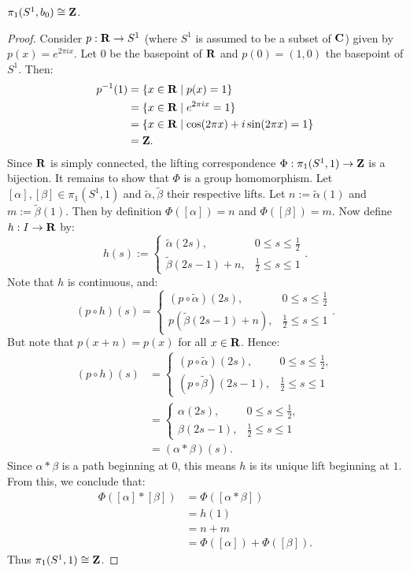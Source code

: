 \begin{theorem}
	$\pi_1(S^1,b_0) \cong \mathbf{Z}$.
\end{theorem}
	\begin{proof}
		Consider $p:\mathbf{R} \rightarrow S^1$ (where $S^1$ is assumed to be a subset of $\mathbf{C}$) given by $p(x) = e^{2 \pi i x}$. Let $0$ be the basepoint of $\mathbf{R}$ and $p(0) = (1,0)$ the basepoint of $S^1$. Then:
		\begin{align*}
			p^{-1}(1)
			&=  \{x \in \mathbf{R} \mid p(x) = 1\} \\
			&= \{x \in \mathbf{R} \mid e^{2 \pi i x} = 1\} \\
			&=  \{x \in \mathbf{R} \mid \cos(2 \pi x) + i \sin (2 \pi x) = 1\}\\
			& = \mathbf{Z}.
		\end{align*}	
	Since $\mathbf{R}$ is simply connected, the lifting correspondence $\Phi:\pi_1(S^1, 1) \rightarrow \mathbf{Z}$ is a bijection. It remains to show that $\Phi$ is a group homomorphism. Let $[\alpha],[\beta] \in \pi_1(S^1,1)$ and $\tilde{\alpha},\tilde{\beta}$ their respective lifts. Let $n:= \tilde{\alpha}(1)$ and $m := \tilde{\beta}(1)$. Then by definition $\Phi([\alpha]) = n$ and $\Phi([\beta]) = m$. Now define $h:I \rightarrow \mathbf{R}$ by:
	\[
		h(s) := 
		\begin{cases}
			\tilde{\alpha}(2s), & 0 \leq s \leq \frac{1}{2} \\
			\tilde{\beta}(2s-1) + n, & \frac{1}{2} \leq s \leq 1
		\end{cases}.
	\]
	Note that $h$ is continuous, and:
	\[
		(p \circ h)(s) =
		\begin{cases}
			(p \circ \tilde{\alpha})(2s), & 0\leq s \leq \frac{1}{2} \\
			p( \tilde{\beta}(2s-1) + n), & \frac{1}{2} \leq s \leq 1
		\end{cases}.
	\] 
	But note that $p(x+n) = p(x)$ for all $x \in \mathbf{R}$. Hence:
		\begin{align*}
			(p \circ h)(s) 
			&=\begin{cases}
				(p \circ \tilde{\alpha})(2s), & 0\leq s \leq \frac{1}{2},\\
				(p \circ \tilde{\beta})(2s-1), & \frac{1}{2} \leq s \leq 1
				\end{cases} \\
			&=\begin{cases}
				\alpha(2s), & 0\leq s \leq \frac{1}{2},\\
				\beta(2s-1), & \frac{1}{2} \leq s \leq 1
				\end{cases} \\
			&= (\alpha * \beta)(s).
		\end{align*}
	Since $\alpha \ast \beta$ is a path beginning at $0$, this means $h$ is its unique lift beginning at $1$. From this, we conclude that:
		\begin{align*}
			\Phi([\alpha] \ast [\beta])
			&= \Phi([\alpha \ast \beta]) \\
			&= h(1) \\
			&= n + m \\
			&= \Phi([\alpha]) + \Phi([\beta]).
		\end{align*}
	Thus $\pi_1(S^1,1) \cong \mathbf{Z}$.
\end{proof}












